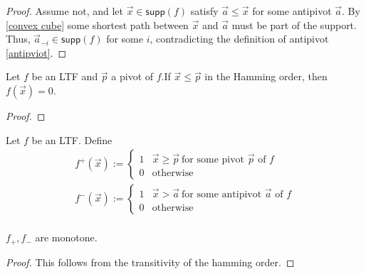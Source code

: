 \begin{proof}
	Assume not, and let $\vec{x}\in \mathsf{supp}(f)$ satisfy $\vec{a} \leq \vec{x}$ for some antipivot $\vec{a}$. By \ref{convex cube} some shortest path between $\vec{x}$ and $\vec{a}$ must be part of the support. Thus, $\vec{a}_{-i}\in\mathsf{supp}(f)$ for some $i$, contradicting the definition of antipivot \ref{antipviot}. 
\end{proof}
\begin{lemma}\label{enter support}
	Let $f$ be an LTF and $\vec{p}$ a pivot of $f$.If $\vec{x} \leq \vec{p}$ in the Hamming order, then $f(\vec{x}) = 0$.
\end{lemma}
\begin{proof}
	
\end{proof}


\begin{definition}\label{defmonoparts}
		Let $f$ be an LTF. Define 
	\begin{align*}
	f^+(\vec{x}) := \begin{cases}
	1 & \vec{x} \geq \vec{p}~ \text{for some pivot $\vec{p}$ of $f$}\\
	0 & \text{otherwise}
	\end{cases}\\
	f^-(\vec{x}) := \begin{cases}
	1 & \vec{x} > \vec{a}~ \text{for some antipivot $\vec{a}$ of $f$}\\
	0 & \text{otherwise}
	\end{cases}\\
	\end{align*}
\end{definition}
\begin{proposition}\label{mono parts are mono}
	$f_+,f_-$ are monotone.
\end{proposition}
\begin{proof}
	This follows from the transitivity of the hamming order.
\end{proof}

